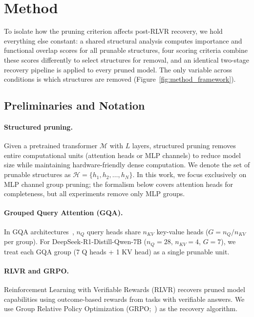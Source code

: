 \section{Method}
\label{sec:method}

To isolate how the pruning criterion affects post-RLVR recovery, we hold everything else constant: a shared structural analysis computes importance and functional overlap scores for all prunable structures, four scoring criteria combine these scores differently to select structures for removal, and an identical two-stage recovery pipeline is applied to every pruned model.
The only variable across conditions is which structures are removed (Figure~\ref{fig:method_framework}).

\subsection{Preliminaries and Notation}
\label{sec:prelim}

\paragraph{Structured pruning.}
Given a pretrained transformer $\mathcal{M}$ with $L$ layers, structured pruning removes entire computational units (attention heads or MLP channels) to reduce model size while maintaining hardware-friendly dense computation.
We denote the set of prunable structures as $\mathcal{H} = \{h_1, h_2, \ldots, h_N\}$.
In this work, we focus exclusively on MLP channel group pruning; the formalism below covers attention heads for completeness, but all experiments remove only MLP groups.

\paragraph{Grouped Query Attention (GQA).}
In GQA architectures~\citep{ainslie2023gqa}, $n_Q$ query heads share $n_{KV}$ key-value heads ($G = n_Q / n_{KV}$ per group).
For DeepSeek-R1-Distill-Qwen-7B ($n_Q{=}28$, $n_{KV}{=}4$, $G{=}7$), we treat each GQA group (7 Q heads + 1 KV head) as a single prunable unit.

\paragraph{RLVR and GRPO.}
Reinforcement Learning with Verifiable Rewards (RLVR) recovers pruned model capabilities using outcome-based rewards from tasks with verifiable answers.
We use Group Relative Policy Optimization (GRPO;~\citealp{shao2024grpo}) as the recovery algorithm.

